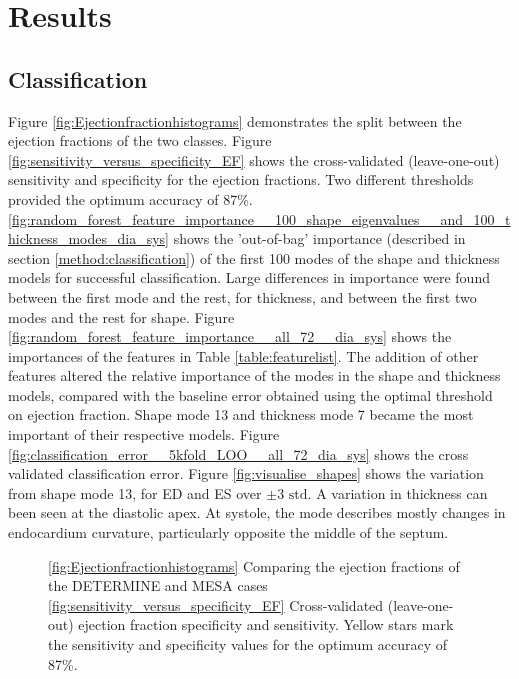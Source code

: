 \documentclass{llncs}
\begin{document}
\section{Results}
	\subsection{Classification}
Figure \ref{fig:Ejectionfractionhistograms} demonstrates the split between the ejection fractions of the two classes. Figure \ref{fig:sensitivity_versus_specificity_EF} shows the cross-validated (leave-one-out) sensitivity and specificity for the ejection fractions. Two different thresholds provided the optimum accuracy of 87\%. 
 \ref{fig:random_forest_feature_importance__100_shape_eigenvalues__and_100_thickness_modes_dia_sys} shows the 'out-of-bag' importance (described in section  \ref{method:classification}) of the first 100 modes of the shape and thickness models for successful classification. Large differences in importance were found between the first mode and the rest, for thickness, and between the first two modes and the rest for shape. Figure \ref{fig:random_forest_feature_importance__all_72__dia_sys} shows the importances of the features in Table \ref{table:featurelist}. The addition of other features altered the relative importance of the modes in the shape and thickness models, compared with the baseline error obtained using the optimal threshold on ejection fraction. Shape mode 13 and thickness mode 7 became the most important of their respective models. Figure    \ref{fig:classification_error__5kfold_LOO__all_72_dia_sys} shows the cross validated classification error. Figure \ref{fig:visualise_shapes} shows the variation from shape mode 13, for ED and ES over $\pm$3 $\mathrm{std}$. A variation in thickness can been seen at the diastolic apex. At systole, the mode describes mostly changes in endocardium curvature, particularly opposite the middle of the septum.
		
		\begin{figure}[]
		
\begin{center} 
\!
\caption{ \ref{fig:Ejectionfractionhistograms} Comparing the ejection fractions of the DETERMINE and MESA cases \ref{fig:sensitivity_versus_specificity_EF} Cross-validated (leave-one-out) ejection fraction specificity and sensitivity. Yellow stars mark the sensitivity and specificity values for the optimum accuracy of 87\%.}
\label{fig:EFs}
\end{center}    

		\end{figure}
\end{document}
